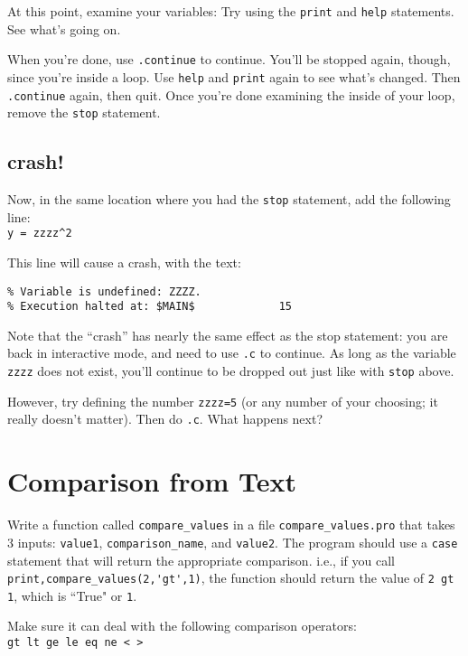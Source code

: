 \documentclass{article}
\begin{document}
\begin{spacing}{1.0}
At this point, examine your variables: Try using the \verb|print| and
\verb|help| statements.  See what's going on.

When you're done, use \verb|.continue| to continue.  You'll be stopped again,
though, since you're inside a loop.  Use \verb|help| and \verb|print| again to
see what's changed.  Then \verb|.continue| again, then quit.  Once you're done
examining the inside of your loop, remove the \verb|stop| statement.

\begin{samepage}
\section{crash!}
Now, in the same location where you had the \verb|stop| statement, add the
following line:\\
\verb|y = zzzz^2|

This line will cause a crash, with the text: \\
\begin{lstlisting}
% Variable is undefined: ZZZZ.
% Execution halted at: $MAIN$             15
\end{lstlisting}

Note that the ``crash'' has nearly the same effect as the stop statement:
you are back in interactive mode, and need to use \verb|.c| to continue.  As
long as the variable \verb|zzzz| does not exist, you'll continue to be dropped
out just like with \verb|stop| above.  

However, try defining the number \verb|zzzz=5| (or any number of your choosing;
it really doesn't matter).  Then do \verb|.c|.  What happens next?
\end{samepage}

\section{Comparison from Text}
Write a function called \verb|compare_values| in a file
\verb|compare_values.pro| that takes 3 inputs: \verb|value1|,
\verb|comparison_name|, and \verb|value2|.  The program should use a
\verb|case| statement that will return the appropriate comparison.  i.e., if
you call \verb|print,compare_values(2,'gt',1)|, the function should return the
value of \verb|2 gt 1|, which is “True" or \verb|1|.

Make sure it can deal with the following comparison operators:\\
\verb|gt lt ge le eq ne < >|


\end{spacing}
\end{document}
